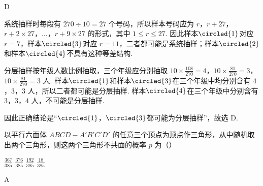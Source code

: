 \begin{answer}
D
\end{answer}

\begin{solution}
系统抽样时每段有 \(270\div10=27\) 个号码，所以样本号码应为
\(r\)，\(r+27\)，\(r+2\times27\)，\(\dots\)，\(r+9\times27\)
的形式，其中 \(1\leqslant r\leqslant27\). 因此样本\(\circled{1}\)对应 \(r=7\)，样本\(\circled{3}\)对应 \(r=11\)，二者都可能是系统抽样；样本\(\circled{2}\)和样本\(\circled{4}\)不具有这种等差结构.

分层抽样按年级人数比例抽取，三个年级应分别抽取 \(10\times\frac{108}{270}=4\)，\(10\times\frac{81}{270}=3\)，\(10\times\frac{81}{270}=3\) 人. 样本\(\circled{1}\)和样本\(\circled{3}\)在三个年级中均分别含有 \(4\)，\(3\)，\(3\) 人，所以二者都可能是分层抽样. 样本\(\circled{4}\)在三个年级中分别含有 \(3\)，\(3\)，\(4\) 人，不可能是分层抽样.

因此正确结论是“\(\circled{1}\)，\(\circled{3}\)都可能为分层抽样”，故选 D.
\end{solution}

\begin{problem}
以平行六面体 \(ABCD - A'B'C'D'\) 的任意三个顶点为顶点作三角形，从中随机取出两个三角形，则这两个三角形不共面的概率 \(p\) 为（\quad）

\choices
    {\(\frac{367}{385}\)}
    {\(\frac{376}{385}\)}
    {\(\frac{192}{385}\)}
    {\(\frac{18}{385}\)}
\end{problem}

\begin{answer}
A
\end{answer}

